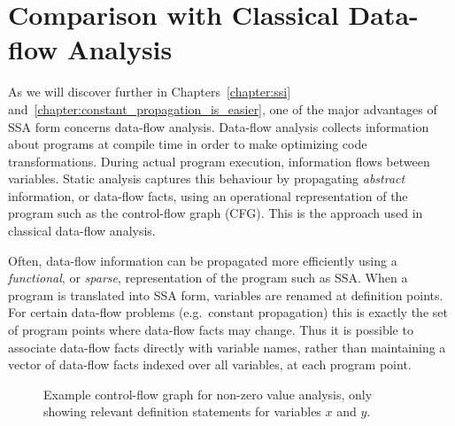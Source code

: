 
\section{Comparison with Classical Data-flow Analysis}
\label{sec:vanilla:dfa}
As we will discover further in Chapters~\ref{chapter:ssi} and~\ref{chapter:constant_propagation_is_easier}, one of the major advantages of SSA form concerns data-flow analysis.
Data-flow analysis collects information about programs
at compile time
in order to make optimizing code transformations.
During actual program execution, information flows between
variables. Static analysis captures
this behaviour by propagating \textit{abstract} information,
or data-flow facts,
using an operational representation of the 
program such as the control-flow graph (CFG).
This is the approach used in 
classical data-flow analysis.

Often, data-flow information can be propagated more efficiently
using a \textit{functional}, or \textit{sparse},
representation of the program such 
as SSA.
When a program is translated into SSA form,
variables are renamed at definition points.
For certain data-flow problems (e.g.~constant propagation)
this is exactly the set of program points where data-flow
facts may change.
Thus it is possible to associate data-flow facts directly with 
variable names, rather than
maintaining a vector of data-flow facts indexed over all variables,
at each program point.

\begin{figure}[t]%
%
\caption{Example control-flow graph for
  non-zero value analysis, only showing relevant definition statements for
  variables $x$ and $y$.}
\label{fig:part1-vanilla-cfgexample}
\end{figure}


